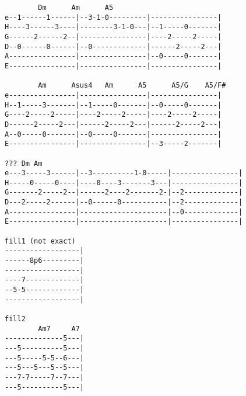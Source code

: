 \begin{verbatim}
        Dm      Am      A5
e--1------1------|--3-1-0---------|----------------|
H----3------3----|--------3-1-0---|--1-----0-------|
G------2------2--|----------------|----2-----2-----|
D--0------0------|--0-------------|------2-----2---|
A----------------|----------------|--0-----0-------|
E----------------|----------------|----------------|

        Am      Asus4   Am      A5      A5/G    A5/F#
e----------------|----------------|----------------|
H--1-----3-------|--1-----0-------|--0-----0-------|
G----2-----2-----|----2-----2-----|----2-----2-----|
D------2-----2---|------2-----2---|------2-----2---|
A--0-----0-------|--0-----0-------|----------------|
E----------------|----------------|--3-----2-------|

??? Dm Am
e---3-----3------|--3----------1-0-----|----------------|
H-----0-----0----|----0----3-------3---|----------------|
G-------2-----2--|------2----2-------2-|--2-------------|
D---2-----2------|--0------0-----------|--2-------------|
A----------------|---------------------|--0-------------|
E----------------|---------------------|----------------|

fill1 (not exact)
------------------|
------8p6---------|
------------------|
----7-------------|
--5-5-------------|
------------------|

fill2
        Am7     A7
--------------5---|
---5----------5---|
---5-----5-5--6---|
---5---5---5--5---|
---7-7-----7--7---|
---5----------5---|
\end{verbatim}